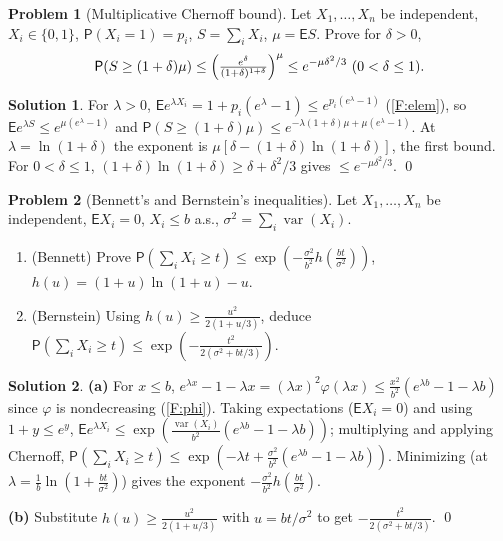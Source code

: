 \documentclass[12pt,a4paper]{article}
\theoremstyle{definition}
\newtheorem{exercise}{Problem}
\newtheorem*{solution*}{Solution}
\newcommand\expc{\mathsf{E}}
\newcommand\prb{\mathsf{P}}
\DeclareMathOperator\var{var}
\begin{document}
\begin{exercise}[Multiplicative Chernoff bound]\label{prob:multcher}
Let $X_1,\ldots,X_n$ be independent, $X_i\in\{0,1\}$, $\prb(X_i=1)=p_i$, $S=\sum_iX_i$, $\mu=\expc S$. Prove for $\delta>0$,
\[
\prb(S\ge(1+\delta)\mu)\le\Bigl(\tfrac{e^\delta}{(1+\delta)^{1+\delta}}\Bigr)^\mu\le e^{-\mu\delta^2/3}\ (0<\delta\le1).
\]
\end{exercise}
\begin{solution*}
For $\lambda>0$, $\expc e^{\lambda X_i}=1+p_i(e^\lambda-1)\le e^{p_i(e^\lambda-1)}$ (\ref{F:elem}), so $\expc e^{\lambda S}\le e^{\mu(e^\lambda-1)}$ and $\prb(S\ge(1+\delta)\mu)\le e^{-\lambda(1+\delta)\mu+\mu(e^\lambda-1)}$. At $\lambda=\ln(1+\delta)$ the exponent is $\mu[\delta-(1+\delta)\ln(1+\delta)]$, the first bound. For $0<\delta\le1$, $(1+\delta)\ln(1+\delta)\ge\delta+\delta^2/3$ gives $\le e^{-\mu\delta^2/3}$. \qed
\end{solution*}

\begin{exercise}[Bennett's and Bernstein's inequalities]\label{prob:bern}
Let $X_1,\ldots,X_n$ be independent, $\expc X_i=0$, $X_i\le b$ a.s., $\sigma^2=\sum_i\var(X_i)$.
\begin{enumerate}[label=(\alph*)]
\item (Bennett) Prove $\prb(\sum_iX_i\ge t)\le\exp(-\tfrac{\sigma^2}{b^2}h(\tfrac{bt}{\sigma^2}))$, $h(u)=(1+u)\ln(1+u)-u$.
\item (Bernstein) Using $h(u)\ge\tfrac{u^2}{2(1+u/3)}$, deduce $\prb(\sum_iX_i\ge t)\le\exp(-\tfrac{t^2}{2(\sigma^2+bt/3)})$.
\end{enumerate}
\end{exercise}
\begin{solution*}
\textbf{(a)} For $x\le b$, $e^{\lambda x}-1-\lambda x=(\lambda x)^2\varphi(\lambda x)\le\tfrac{x^2}{b^2}(e^{\lambda b}-1-\lambda b)$ since $\varphi$ is nondecreasing (\ref{F:phi}). Taking expectations ($\expc X_i=0$) and using $1+y\le e^y$, $\expc e^{\lambda X_i}\le\exp(\tfrac{\var(X_i)}{b^2}(e^{\lambda b}-1-\lambda b))$; multiplying and applying Chernoff, $\prb(\sum_iX_i\ge t)\le\exp(-\lambda t+\tfrac{\sigma^2}{b^2}(e^{\lambda b}-1-\lambda b))$. Minimizing (at $\lambda=\tfrac1b\ln(1+\tfrac{bt}{\sigma^2})$) gives the exponent $-\tfrac{\sigma^2}{b^2}h(\tfrac{bt}{\sigma^2})$.

\textbf{(b)} Substitute $h(u)\ge\tfrac{u^2}{2(1+u/3)}$ with $u=bt/\sigma^2$ to get $-\tfrac{t^2}{2(\sigma^2+bt/3)}$. \qed
\end{solution*}
\end{document}
